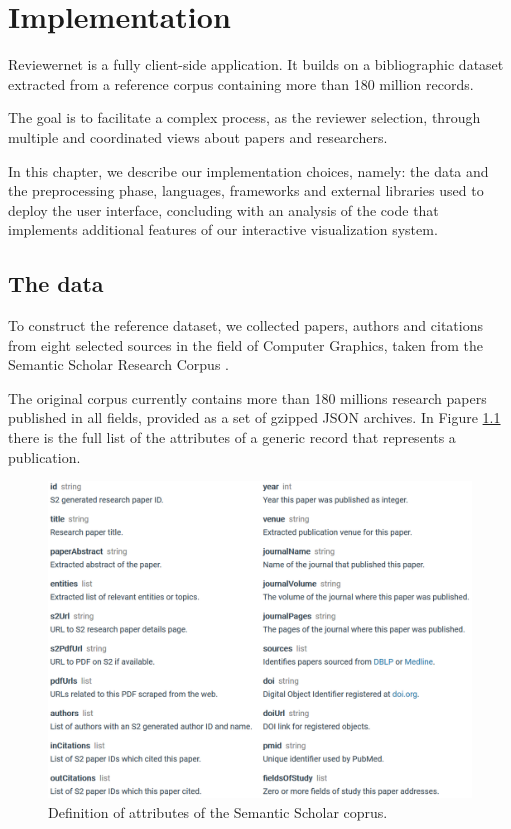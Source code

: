 \chapter{Implementation}
\label{sec:impl}
Reviewernet is a fully client-side application. It builds on a bibliographic dataset extracted from a reference corpus containing more than 180 million records.

The goal is to facilitate a complex process, as the reviewer selection, through multiple and coordinated views about papers and researchers.

In this chapter, we describe our implementation choices, namely: the data and the preprocessing phase, languages, frameworks and external libraries used to deploy the user interface, concluding with an analysis of the code that implements additional features of our interactive visualization system.
\section{The data}
To construct the reference dataset, we collected papers, authors and citations from eight selected sources in the field of Computer Graphics, taken from the Semantic Scholar Research Corpus \cite{ammar:18}. 

The original corpus currently contains more than 180 millions research papers published in all fields, provided as a set of gzipped JSON archives. In Figure \ref{jsonfields} there is the full list of the attributes of a generic record that represents a publication.

\begin{figure}[!ht]
    \centering
    \includegraphics[width=\textwidth]{fig/corpusfields.png}
    \caption{Definition of attributes of the Semantic Scholar coprus.\label{jsonfields}}
\end{figure}


